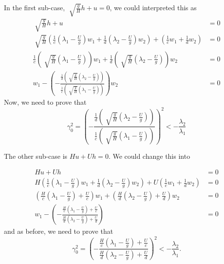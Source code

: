 \documentclass{article}
\theoremstyle{definition}
\begin{document}
    In the first sub-case, $\sqrt[]{\frac gH} h + u =0$, we could interpreted this as 
    \begin{align}
        \sqrt[]{\frac gH} h + u &=0 \\
        \sqrt[]{\frac gH}\left(\frac{1}{c}\left(\lambda_1 -\frac{ U}{g}\right) w_1 +  \frac{1}{d}\left(\lambda_2 -\frac{ U}{g}\right) w_2\right)
         + \left(\frac{1}{c} w_1 + \frac{1}{d} w_2 \right)&=0 \\
        \frac{1}{c}\left( \sqrt[]{\frac gH}  \left(\lambda_1 -\frac{ U}{g}\right) \right) w_1 
        + \frac{1}{d}\left( \sqrt[]{\frac gH}  \left(\lambda_2 -\frac{ U}{g}\right) \right) w_2 
        &= 0 \\
        w_1 - \left(-  \frac{
            \frac{1}{d}\left( \sqrt[]{\frac gH}  \left(\lambda_2 -\frac{ U}{g}\right) \right)
        }
        {
            \frac{1}{c}\left( \sqrt[]{\frac gH}  \left(\lambda_1 -\frac{ U}{g}\right) \right)
        }
        \right) w_2 &=0
    \end{align}
    Now, we need to prove that $$\gamma_0^2 = \left( - \frac{
        \frac{1}{d}\left( \sqrt[]{\frac gH} \left(\lambda_2 -\frac{ U}{g}\right) \right)
    }
    {
        \frac{1}{c}\left( \sqrt[]{\frac gH} \left(\lambda_1 -\frac{ U}{g}\right) \right)
    }
    \right)^2 < - \frac{\lambda_2}{\lambda_1}$$
    
    The other sub-case is $Hu + Uh = 0$. We could change this into 

    \begin{align}
        Hu + Uh &= 0\\
        H\left(
            \frac{1}{c}\left(\lambda_1 -\frac{ U}{g}\right) w_1 +  \frac{1}{d}\left(\lambda_2 -\frac{ U}{g}\right) w_2
            \right)
         + U\left(\frac{1}{c} w_1 + \frac{1}{d} w_2 \right)&= 0\\
        \left(\frac{H}{c}\left(\lambda_1 -\frac{ U}{g}\right) + \frac{U}{c}\right) w_1 
         + \left(\frac{H}{d}\left(\lambda_2 -\frac{ U}{g}\right) + \frac{U}{d}\right) w_2 &=0 \\
        w_1 - \left(- \frac{
            \frac{H}{c}\left(\lambda_1 -\frac{ U}{g}\right) + \frac{U}{c}
        }{
            \frac{H}{d}\left(\lambda_2 -\frac{ U}{g}\right) + \frac{U}{d}
        }\right) &= 0 
    \end{align}
    and as before, we need to prove that 
    $$
        \gamma_0^2 = \left(- \frac{
            \frac{H}{c}\left(\lambda_1 -\frac{ U}{g}\right) + \frac{U}{c}
        }{
            \frac{H}{d}\left(\lambda_2 -\frac{ U}{g}\right) + \frac{U}{d}
        }\right)^2 < - \frac{\lambda_2}{\lambda_1}.
    $$
\end{document}
